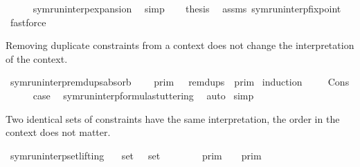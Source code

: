 \begin{isabellebody}
\ \ \ \ \isamarkupfalse%
\ symrun{\isacharunderscore}interp{\isacharunderscore}expansion\ \isamarkupfalse%
\ simp\isanewline
\ \ \isamarkupfalse%
\ {\isacharquery}thesis\ \isamarkupfalse%
\ assms\ symrun{\isacharunderscore}interp{\isacharunderscore}fixpoint\ \isamarkupfalse%
\ fastforce\isanewline
{}\isamarkupfalse%
%
\endisatagproof
{\isafoldproof}%
%
\isadelimproof
%
\endisadelimproof
%
\begin{isamarkuptext}%
Removing duplicate constraints from a context does not change the
  interpretation of the context.%
\end{isamarkuptext}\isamarkuptrue%
\isamarkupfalse%
\ symrun{\isacharunderscore}interp{\isacharunderscore}remdups{\isacharunderscore}absorb{\isacharcolon}\isanewline
\ \ {\isacartoucheopen}{\isasymlbrakk}{\isasymlbrakk}\ {\isasymGamma}\ {\isasymrbrakk}{\isasymrbrakk}\isactrlsub p\isactrlsub r\isactrlsub i\isactrlsub m\ {\isacharequal}\ {\isasymlbrakk}{\isasymlbrakk}\ remdups\ {\isasymGamma}\ {\isasymrbrakk}{\isasymrbrakk}\isactrlsub p\isactrlsub r\isactrlsub i\isactrlsub m{\isacartoucheclose}\isanewline
%
\isadelimproof
%
\endisadelimproof
%
\isatagproof
{}\isamarkupfalse%
\ {\isacharparenleft}induction\ {\isasymGamma}{\isacharparenright}\isanewline
\ \ \isamarkupfalse%
\ Cons\isanewline
\ \ \ \ \isamarkupfalse%
\ {\isacharquery}case\ \isamarkupfalse%
\ symrun{\isacharunderscore}interp{\isacharunderscore}formula{\isacharunderscore}stuttering\ \isamarkupfalse%
\ auto\isanewline
{}\isamarkupfalse%
\ simp%
\endisatagproof
{\isafoldproof}%
%
\isadelimproof
%
\endisadelimproof
%
\begin{isamarkuptext}%
Two identical sets of constraints have the same interpretation,
  the order in the context does not matter.%
\end{isamarkuptext}\isamarkuptrue%
\isamarkupfalse%
\ symrun{\isacharunderscore}interp{\isacharunderscore}set{\isacharunderscore}lifting{\isacharcolon}\isanewline
\ \ \ {\isacartoucheopen}set\ {\isasymGamma}\ {\isacharequal}\ set\ {\isasymGamma}{\isacharprime}{\isacartoucheclose}\isanewline
\ \ \ \ \ {\isacartoucheopen}{\isasymlbrakk}{\isasymlbrakk}\ {\isasymGamma}\ {\isasymrbrakk}{\isasymrbrakk}\isactrlsub p\isactrlsub r\isactrlsub i\isactrlsub m\ {\isacharequal}\ {\isasymlbrakk}{\isasymlbrakk}\ {\isasymGamma}{\isacharprime}\ {\isasymrbrakk}{\isasymrbrakk}\isactrlsub p\isactrlsub r\isactrlsub i\isactrlsub m{\isacartoucheclose}\isanewline

\end{isabellebody}
